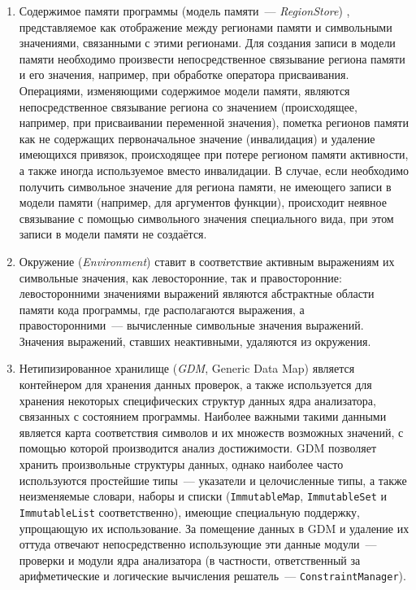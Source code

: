 \begin{enumerate}
 \item Содержимое памяти программы (модель памяти~--- \textit{RegionStore}) \cite{csa-store}, представляемое как отображение между регионами памяти и символьными значениями, связанными с этими регионами. Для создания записи в модели памяти необходимо произвести непосредственное связывание региона памяти и его значения, например, при обработке оператора присваивания. Операциями, изменяющими содержимое модели памяти, являются непосредственное связывание региона со значением (происходящее, например, при присваивании переменной значения), пометка регионов памяти как не содержащих первоначальное значение (инвалидация) и удаление имеющихся привязок, происходящее при потере регионом памяти активности, а также иногда используемое вместо инвалидации. В случае, если необходимо получить символьное значение для региона памяти, не имеющего записи в модели памяти (например, для аргументов функции), происходит неявное связывание с помощью символьного значения специального вида, при этом записи в модели памяти не создаётся.

 \item Окружение (\textit{Environment}) ставит в соответствие активным выражениям их символьные значения, как левосторонние, так и правосторонние: левосторонними значениями выражений являются абстрактные области памяти кода программы, где располагаются выражения, а правосторонними~--- вычисленные символьные значения выражений. Значения выражений, ставших неактивными, удаляются из окружения.
 
 \item Нетипизированное хранилище (\textit{GDM}, Generic Data Map) является контейнером для хранения данных проверок, а также используется для хранения некоторых специфических структур данных ядра анализатора, связанных с состоянием программы. Наиболее важными такими данными является карта соответствия символов и их множеств возможных значений, с помощью которой производится анализ достижимости. GDM позволяет хранить произвольные структуры данных, однако наиболее часто используются простейшие типы~--- указатели и целочисленные типы, а также неизменяемые словари, наборы и списки (\texttt{ImmutableMap}, \texttt{ImmutableSet} и \texttt{ImmutableList} соответственно), имеющие специальную поддержку, упрощающую их использование. За помещение данных в GDM и удаление их оттуда отвечают непосредственно использующие эти данные модули~--- проверки и модули ядра анализатора (в частности, ответственный за арифметические и логические вычисления решатель~--- \texttt{ConstraintManager}).
\end{enumerate}

